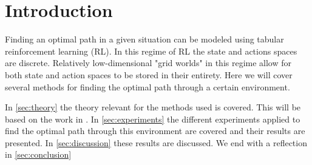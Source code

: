 \documentclass{article}
\theoremstyle{plain}
\theoremstyle{definition}
\theoremstyle{remark}
\begin{document}
\newpage
\begin{abstract}
REPLACE THIS [This document provides a basic paper template and submission guidelines.
Abstracts must be a single paragraph, ideally between 4--6 sentences long.
Gross violations will trigger corrections at the camera-ready phase.]
\end{abstract}

\section{Introduction} \label{sec:introduction}
Finding an optimal path in a given situation can be modeled using tabular reinforcement learning (RL). In this regime of RL the state and actions spaces are discrete. Relatively low-dimensional "grid worlds" in this regime allow for both state and action spaces to be stored in their entirety. Here we will cover several methods for finding the optimal path through a certain environment.  

In \autoref{sec:theory} the theory relevant for the methods used is covered. This will be based on the work in \cite{RL_book}.
In \autoref{sec:experiments} the different experiments applied to find the optimal path through this environment are covered and their results are presented. In \autoref{sec:discussion} these results are discussed. We end with a reflection in \autoref{sec:conclusion}
\end{document}

